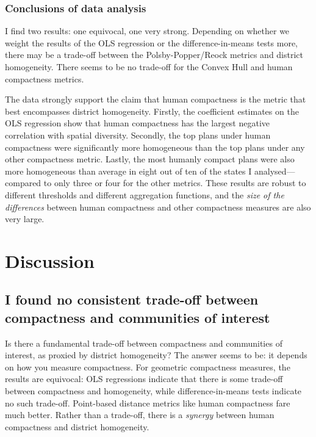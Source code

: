 \documentclass[]{article}
\begin{document}
\hypertarget{conclusions-of-data-analysis}{%
\subsubsection{Conclusions of data
analysis}\label{conclusions-of-data-analysis}}

I find two results: one equivocal, one very strong. Depending on whether
we weight the results of the OLS regression or the difference-in-means
tests more, there may be a trade-off between the Polsby-Popper/Reock
metrics and district homogeneity. There seems to be no trade-off for the
Convex Hull and human compactness metrics.

The data strongly support the claim that human compactness is the metric
that best encompasses district homogeneity. Firstly, the coefficient
estimates on the OLS regression show that human compactness has the
largest negative correlation with spatial diversity. Secondly, the top
plans under human compactness were significantly more homogeneous than
the top plans under any other compactness metric. Lastly, the most
humanly compact plans were also more homogeneous than average in eight
out of ten of the states I analysed---compared to only three or four for
the other metrics. These results are robust to different thresholds and
different aggregation functions, and the \emph{size of the differences}
between human compactness and other compactness measures are also very
large.

\hypertarget{discussion}{%
\section{Discussion}\label{discussion}}

\hypertarget{i-found-no-consistent-trade-off-between-compactness-and-communities-of-interest}{%
\subsection{I found no consistent trade-off between compactness and
communities of
interest}\label{i-found-no-consistent-trade-off-between-compactness-and-communities-of-interest}}

Is there a fundamental trade-off between compactness and communities of
interest, as proxied by district homogeneity? The answer seems to be: it
depends on how you measure compactness. For geometric compactness
measures, the results are equivocal: OLS regressions indicate that there
is some trade-off between compactness and homogeneity, while
difference-in-means tests indicate no such trade-off. Point-based
distance metrics like human compactness fare much better. Rather than a
trade-off, there is a \emph{synergy} between human compactness and
district homogeneity.
\end{document}
